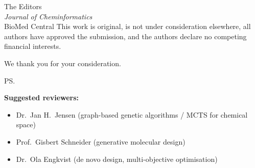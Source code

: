 \documentclass[11pt,a4paper]{letter}
\begin{document}
\begin{letter}{%
  The Editors \\
  \textit{Journal of Cheminformatics} \\
  BioMed Central
}
This work is original, is not under consideration elsewhere, all authors have approved the submission, and the authors declare no competing financial interests.

\closing{We thank you for your consideration.}

\ps{%
\textbf{Suggested reviewers:}\\
\begin{itemize}[leftmargin=*, itemsep=1pt]
  \item Dr.\ Jan H.\ Jensen (graph-based genetic algorithms / MCTS for chemical space)
  \item Prof.\ Gisbert Schneider (generative molecular design)
  \item Dr.\ Ola Engkvist (de novo design, multi-objective optimisation)
\end{itemize}
}

\end{letter}
\end{document}
